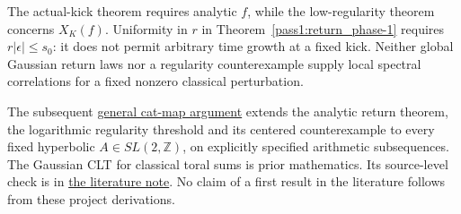 The actual-kick theorem requires analytic \(f\), while the low-regularity
theorem concerns \(X_K(f)\). Uniformity in \(r\) in Theorem~\ref{pass1:return_phase-1} requires
\(r|\epsilon|\le s_0\): it does not permit arbitrary time growth at
a fixed kick. Neither global Gaussian return laws nor a regularity
counterexample supply local spectral correlations for a fixed
nonzero classical perturbation.

The subsequent \href{https://github.com/ChurilovMaksim/BGS/blob/main/mathematics/general_cat_return_laws.md}{general cat-map argument}
extends the analytic return theorem, the logarithmic regularity
threshold and its centered counterexample to every fixed hyperbolic
\(A\in SL(2,\mathbb Z)\), on explicitly specified arithmetic subsequences.
The Gaussian CLT for classical toral sums is prior mathematics.
Its source-level check is in
\href{https://github.com/ChurilovMaksim/BGS/blob/main/literature/periodic_return_clt_sources.md}{the literature note}.
No claim of a first result in the literature follows from these
project derivations.

